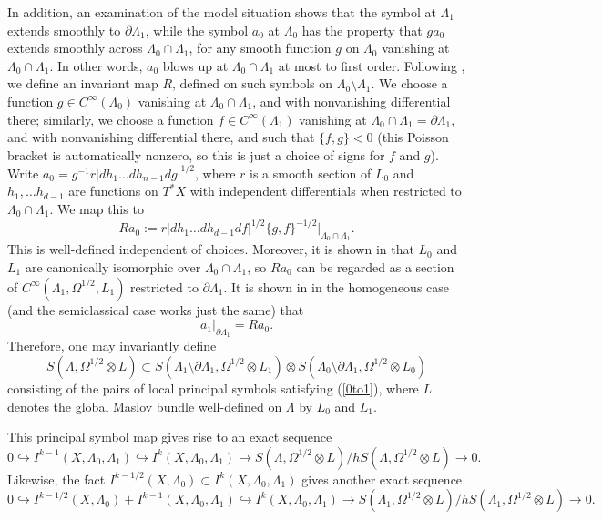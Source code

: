 \documentclass[10pt, a4paper, twoside]{amsart}
\numberwithin{equation}{section}
\theoremstyle{remark}
\begin{document}
\begin{appendix}
	In addition, an examination of the model situation shows that the symbol at $\Lambda_1$ extends smoothly to $\partial \Lambda_1$, while the symbol $a_0$ at $\Lambda_0$ has the property that $g a_0$ extends smoothly across $\Lambda_0 \cap \Lambda_1$, for any smooth function $g$ on $\Lambda_0$ vanishing at $\Lambda_0 \cap \Lambda_1$. In other words, $a_0$ blows up at $\Lambda_0 \cap \Lambda_1$ at most to first order. Following \cite{Melrose-Uhlmann-CPAM-1979}, we define an invariant map $R$, defined on such symbols on $\Lambda_0 \setminus \Lambda_1$. We choose a function $g \in C^\infty(\Lambda_0)$ vanishing at $\Lambda_0 \cap \Lambda_1$, and with nonvanishing differential there; similarly, we choose a function $f \in C^\infty(\Lambda_1)$ vanishing at $\Lambda_0 \cap \Lambda_1 = \partial \Lambda_1$, and with nonvanishing differential there, and such that $\{ f, g \} < 0$ (this Poisson bracket is automatically nonzero, so this is just a choice of signs for $f$ and $g$). Write $a_0 = g^{-1} r |dh_1 \dots dh_{n-1} dg|^{1/2}$, where $r$ is a smooth section of $L_0$ and $h_1, \dots h_{d-1}$ are functions on $T^* X$ with independent differentials when restricted to $\Lambda_0 \cap \Lambda_1$. We map this to 
	$$
	Ra_0 := r |dh_1 \dots dh_{d-1} df|^{1/2} \{ g, f \}^{-1/2} |_{\Lambda_0 \cap \Lambda_1}.
	$$
	This is well-defined independent of choices. Moreover, it is shown in \cite{Melrose-Uhlmann-CPAM-1979} that $L_0$ and $L_1$ are canonically isomorphic over $\Lambda_0 \cap \Lambda_1$, so $Ra_0$ can be regarded as a section of $C^\infty(\Lambda_1, \Omega^{1/2}, L_1)$ restricted to $\partial \Lambda_1$. It is shown in \cite{Melrose-Uhlmann-CPAM-1979} in the homogeneous case (and the semiclassical case works just the same) that 
	\begin{equation}\label{0to1} a_1 |_{\partial \Lambda_1} = R a_0. \end{equation} Therefore, one may invariantly define $$S(\Lambda, \Omega^{1/2} \otimes L) \subset S(\Lambda_1 \setminus \partial \Lambda_1, \Omega^{1/2} \otimes L_1) \otimes S(\Lambda_0 \setminus \partial \Lambda_1, \Omega^{1/2} \otimes L_0)$$ consisting of the pairs of local principal symbols satisfying (\ref{0to1}), where $L$ denotes the global Maslov bundle well-defined on $\Lambda$ by $L_0$ and $L_1$.
	
	This principal symbol map gives rise to an exact sequence
	\begin{equation}\label{exactseq1} 0 \hookrightarrow I^{k - 1}(X, \Lambda_0, \Lambda_1) \hookrightarrow I^k(X, \Lambda_0, \Lambda_1) \longrightarrow S(\Lambda, \Omega^{1/2} \otimes L)/hS(\Lambda, \Omega^{1/2} \otimes L) \longrightarrow 0.
	\end{equation} 
	Likewise, the fact $I^{k - 1/2}(X, \Lambda_0) \subset I^k(X, \Lambda_0, \Lambda_1)$ gives another exact sequence \begin{equation}\label{exactseq2}0 \hookrightarrow I^{k - 1/2}(X, \Lambda_0) + I^{k - 1}(X, \Lambda_0, \Lambda_1) \hookrightarrow I^k(X, \Lambda_0, \Lambda_1) \longrightarrow S(\Lambda_1, \Omega^{1/2} \otimes L)/h S(\Lambda_1, \Omega^{1/2} \otimes L)\longrightarrow 0.\end{equation}
	

\end{appendix}
\end{document}
